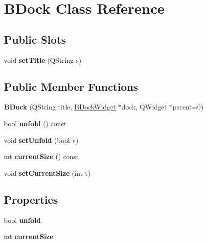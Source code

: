 \hypertarget{class_b_dock}{\section{\-B\-Dock \-Class \-Reference}
\label{class_b_dock}
}
\subsection*{\-Public \-Slots}
\begin{DoxyCompactItemize}
\item 
\hypertarget{class_b_dock_ad0552b2b035ddefbb08d0e43ff2a74d6}{void {\bfseries set\-Title} (\-Q\-String s)}\label{class_b_dock_ad0552b2b035ddefbb08d0e43ff2a74d6}

\end{DoxyCompactItemize}
\subsection*{\-Public \-Member \-Functions}
\begin{DoxyCompactItemize}
\item 
\hypertarget{class_b_dock_a195c91aa591793e1db3bf2d721331b4c}{{\bfseries \-B\-Dock} (\-Q\-String title, \hyperlink{class_b_dock_widget}{\-B\-Dock\-Widget} $\ast$dock, \-Q\-Widget $\ast$parent=0)}\label{class_b_dock_a195c91aa591793e1db3bf2d721331b4c}

\item 
\hypertarget{class_b_dock_a21b9723265fcb7dc4f3e226128e9c2d0}{bool {\bfseries unfold} () const }\label{class_b_dock_a21b9723265fcb7dc4f3e226128e9c2d0}

\item 
\hypertarget{class_b_dock_add467fabf0709c858a032113ec2ede80}{void {\bfseries set\-Unfold} (bool v)}\label{class_b_dock_add467fabf0709c858a032113ec2ede80}

\item 
\hypertarget{class_b_dock_af8bcd829e5f2ab8fba2368540768ebee}{int {\bfseries current\-Size} () const }\label{class_b_dock_af8bcd829e5f2ab8fba2368540768ebee}

\item 
\hypertarget{class_b_dock_a4c684a21bdc74caac19f5f0e70edc728}{void {\bfseries set\-Current\-Size} (int t)}\label{class_b_dock_a4c684a21bdc74caac19f5f0e70edc728}

\end{DoxyCompactItemize}
\subsection*{\-Properties}
\begin{DoxyCompactItemize}
\item 
\hypertarget{class_b_dock_ad753b995b42a49438012098075c19fec}{bool {\bfseries unfold}}\label{class_b_dock_ad753b995b42a49438012098075c19fec}

\item 
\hypertarget{class_b_dock_a2f08c7610017d5c6cb81421666409c9b}{int {\bfseries current\-Size}}\label{class_b_dock_a2f08c7610017d5c6cb81421666409c9b}

\end{DoxyCompactItemize}


